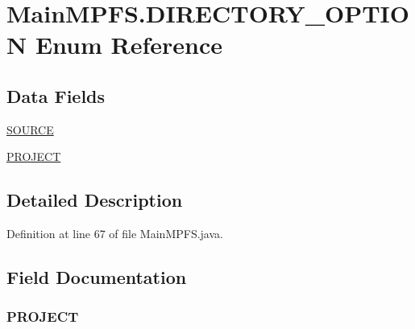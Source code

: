 \hypertarget{enum_microchip_m_p_f_s_1_1_main_m_p_f_s_1_1_d_i_r_e_c_t_o_r_y___o_p_t_i_o_n}{}\section{Main\+M\+P\+F\+S.\+D\+I\+R\+E\+C\+T\+O\+R\+Y\+\_\+\+O\+P\+T\+I\+O\+N Enum Reference}
\label{enum_microchip_m_p_f_s_1_1_main_m_p_f_s_1_1_d_i_r_e_c_t_o_r_y___o_p_t_i_o_n}
\subsection*{Data Fields}
\begin{DoxyCompactItemize}
\item 
\hyperlink{enum_microchip_m_p_f_s_1_1_main_m_p_f_s_1_1_d_i_r_e_c_t_o_r_y___o_p_t_i_o_n_a5d4075dc93e74f488fcf26e40f220629}{S\+O\+U\+R\+C\+E}
\item 
\hyperlink{enum_microchip_m_p_f_s_1_1_main_m_p_f_s_1_1_d_i_r_e_c_t_o_r_y___o_p_t_i_o_n_a6ce6f6c9dd248fa05fa94efbbee21e17}{P\+R\+O\+J\+E\+C\+T}
\end{DoxyCompactItemize}


\subsection{Detailed Description}


Definition at line 67 of file Main\+M\+P\+F\+S.\+java.



\subsection{Field Documentation}
\hypertarget{enum_microchip_m_p_f_s_1_1_main_m_p_f_s_1_1_d_i_r_e_c_t_o_r_y___o_p_t_i_o_n_a6ce6f6c9dd248fa05fa94efbbee21e17}{}
\subsubsection[{P\+R\+O\+J\+E\+C\+T}]{\setlength{\rightskip}{0pt plus 5cm}P\+R\+O\+J\+E\+C\+T}\label{enum_microchip_m_p_f_s_1_1_main_m_p_f_s_1_1_d_i_r_e_c_t_o_r_y___o_p_t_i_o_n_a6ce6f6c9dd248fa05fa94efbbee21e17}


